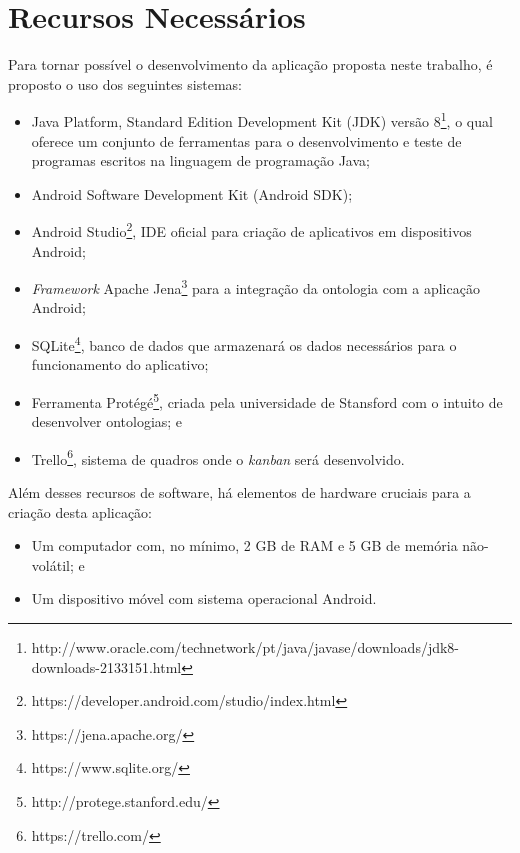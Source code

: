 \chapter{\label{chap:recurs}Recursos Necessários}
Para tornar possível o desenvolvimento da aplicação proposta neste trabalho, é proposto o uso dos seguintes sistemas:
\begin{itemize}
    \item Java Platform, Standard Edition Development Kit (JDK) versão 8\footnote{http://www.oracle.com/technetwork/pt/java/javase/downloads/jdk8-downloads-2133151.html}, o qual oferece um conjunto de ferramentas para o desenvolvimento e teste de programas escritos na linguagem de programação Java;
    \item Android Software Development Kit (Android SDK);
    \item Android Studio\footnote{https://developer.android.com/studio/index.html}, IDE oficial para criação de aplicativos em dispositivos Android;
    \item \emph{Framework} Apache Jena\footnote{https://jena.apache.org/} para a integração da ontologia com a aplicação Android;
    \item SQLite\footnote{https://www.sqlite.org/}, banco de dados que armazenará os dados necessários para o funcionamento do aplicativo;
    \item Ferramenta Protégé\footnote{http://protege.stanford.edu/}, criada pela universidade de Stansford com o intuito de desenvolver ontologias; e
    \item Trello\footnote{https://trello.com/}, sistema de quadros onde o \emph{kanban} será desenvolvido.
\end{itemize}
Além desses recursos de software, há elementos de hardware cruciais para a criação desta aplicação:
    \begin{itemize}
        \item Um computador com, no mínimo, 2 GB de RAM e 5 GB de memória não-volátil; e
        \item Um dispositivo móvel com sistema operacional Android.
    \end{itemize}